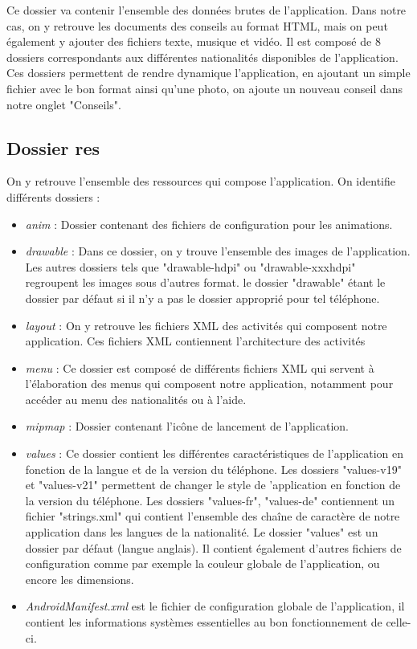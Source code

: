 	Ce dossier va contenir l'ensemble des données brutes de l'application. Dans notre cas, on y retrouve les documents des conseils au format HTML, mais on peut également y ajouter des fichiers texte, musique et vidéo. Il est composé de 8 dossiers correspondants aux différentes nationalités disponibles de l'application. Ces dossiers permettent de rendre dynamique l'application, en ajoutant un simple fichier avec le bon format ainsi qu'une photo, on ajoute un nouveau conseil dans notre onglet "Conseils". 
	
\subsection{Dossier res}
	
	On y retrouve l'ensemble des ressources qui compose l'application. On identifie différents dossiers :\\
	\begin{itemize}
		\item \textit{anim} : Dossier contenant des fichiers de configuration pour les animations.\\
		\item \textit{drawable} : Dans ce dossier, on y trouve l'ensemble des images de l'application. Les autres dossiers tels que "drawable-hdpi" ou "drawable-xxxhdpi" regroupent les images sous d'autres format. le dossier "drawable" étant le dossier par défaut si il n'y a pas le dossier approprié pour tel téléphone.\\
		\item  \textit{layout} : On y retrouve les fichiers XML des activités qui composent notre application. Ces fichiers XML contiennent l'architecture des activités \\
		\item \textit{menu} : Ce dossier est composé de différents fichiers XML qui servent à l'élaboration des menus qui composent notre application, notamment pour accéder au menu des nationalités ou à l'aide.\\
		\item \textit{mipmap} : Dossier contenant l'icône de lancement de l'application.\\
		\item \textit{values} : Ce dossier contient les différentes caractéristiques de l'application en fonction de la langue et de la version du téléphone. Les dossiers "values-v19" et "values-v21" permettent de changer le style de 'application en fonction de la version du téléphone. Les dossiers "values-fr", "values-de" contiennent un fichier "strings.xml" qui contient l'ensemble des chaîne de caractère de notre application dans les langues de la nationalité. Le dossier "values" est un dossier par défaut (langue anglais). Il contient également d'autres fichiers de configuration comme par exemple la couleur globale de l'application, ou encore les dimensions.\\
		\item \textit{AndroidManifest.xml} est le fichier de configuration globale de l'application, il contient les informations systèmes essentielles au bon fonctionnement de celle-ci.\\
	\end{itemize}